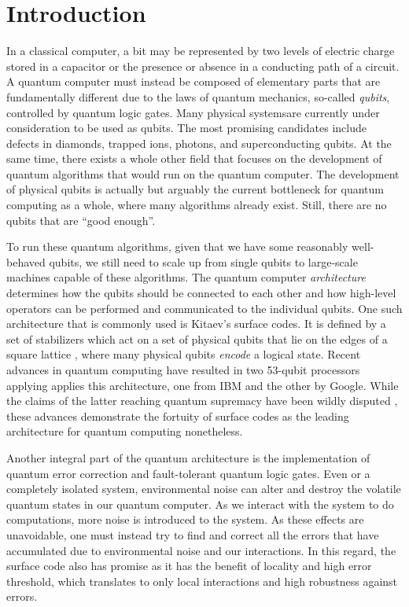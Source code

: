 \chapter{Introduction}

In a classical computer, a bit may be represented by two levels of electric charge stored in a capacitor or the presence or absence in a conducting path of a circuit. A quantum computer must instead be composed of elementary parts that are fundamentally different due to the laws of quantum mechanics, so-called \emph{qubits}, controlled by quantum logic gates. Many physical systemsare currently under consideration to be used as qubits. The most promising candidates include defects in diamonds, trapped ions, photons, and superconducting qubits. At the same time, there exists a whole other field that focuses on the development of quantum algorithms that would run on the quantum computer. The development of physical qubits is actually but arguably the current bottleneck for quantum computing as a whole, where many algorithms already exist. Still, there are no qubits that are ``good enough''.

To run these quantum algorithms, given that we have some reasonably well-behaved qubits, we still need to scale up from single qubits to large-scale machines capable of these algorithms. The quantum computer \emph{architecture} determines how the qubits should be connected to each other and how high-level operators can be performed and communicated to the individual qubits. One such architecture that is commonly used is Kitaev's surface codes. It is defined by a set of stabilizers which act on a set of physical qubits that lie on the edges of a square lattice \cite{dennis2002topological}, where many physical qubits \emph{encode} a logical state. Recent advances in quantum computing have resulted in two 53-qubit processors applying applies this architecture, one from IBM and the other by Google. While the claims of the latter reaching quantum supremacy have been wildly disputed \cite{arute2019quantum}, these advances demonstrate the fortuity of surface codes as the leading architecture for quantum computing nonetheless.   

Another integral part of the quantum architecture is the implementation of quantum error correction and fault-tolerant quantum logic gates. Even or a completely isolated system, environmental noise can alter and destroy the volatile quantum states in our quantum computer. As we interact with the system to do computations, more noise is introduced to the system. As these effects are unavoidable, one must instead try to find and correct all the errors that have accumulated due to environmental noise and our interactions. In this regard, the surface code also has promise as it has the benefit of locality and high error threshold, which translates to only local interactions and high robustness against errors. 

